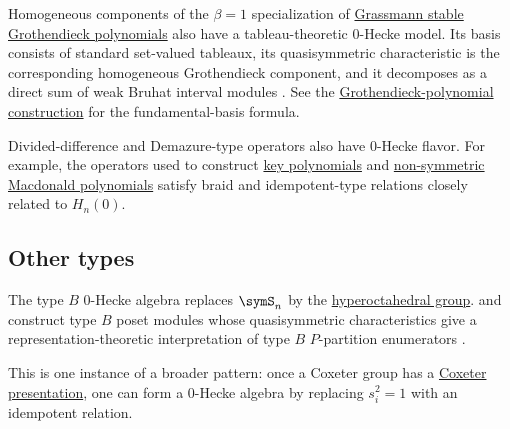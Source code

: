 Homogeneous components of the $\beta=1$ specialization of
\hyperref[grothendieckGrassmann]{Grassmann stable Grothendieck polynomials}
also have a tableau-theoretic 0-Hecke model.  Its basis consists of standard
set-valued tableaux, its quasisymmetric characteristic is the corresponding
homogeneous Grothendieck component, and it decomposes as a direct sum of weak
Bruhat interval modules \cite[Thms.~3.13 and~4.12]{Kim2026x}.  See the
\hyperref[grothendieckStableZeroHecke]{Grothendieck-polynomial construction}
for the fundamental-basis formula.

Divided-difference and Demazure-type operators also have 0-Hecke flavor.  For
example, the operators used to construct \hyperref[key]{key polynomials} and
\hyperref[macdonaldE]{non-symmetric Macdonald polynomials} satisfy braid and
idempotent-type relations closely related to \(H_n(0)\).

\subsection[zeroHeckeOtherTypes]{Other types}

The type \(B\) 0-Hecke algebra replaces \(\symS_n\) by the
\hyperref[permutationsTypeB]{hyperoctahedral group}.  
and  construct type \(B\) poset modules whose
quasisymmetric characteristics give a representation-theoretic interpretation
of type \(B\) \(P\)-partition enumerators \cite{KimSearles2026x}.

This is one instance of a broader pattern: once a Coxeter group has a
\hyperref[coxeterGroups]{Coxeter presentation}, one can form a 0-Hecke
algebra by replacing \(s_i^2=1\) with an idempotent relation.
